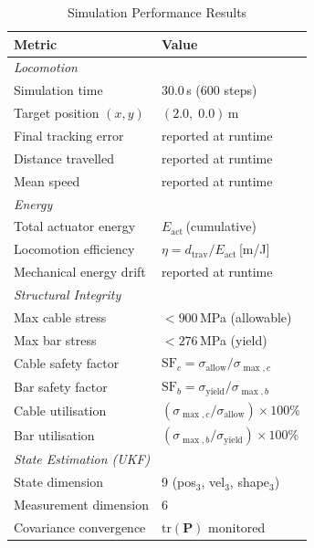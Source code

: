 \begin{table}[htbp]
\centering
\caption{Simulation Performance Results}
\label{tab:performance}
\begin{tabular}{l l}
\hline
\textbf{Metric} & \textbf{Value} \\
\hline
\multicolumn{2}{l}{\textit{Locomotion}} \\
Simulation time          & 30.0\,s (600 steps) \\
Target position $(x,y)$  & $(2.0,\;0.0)$\,m \\
Final tracking error     & reported at runtime \\
Distance travelled       & reported at runtime \\
Mean speed               & reported at runtime \\
\hline
\multicolumn{2}{l}{\textit{Energy}} \\
Total actuator energy    & $E_{\mathrm{act}}$\,(cumulative) \\
Locomotion efficiency    & $\eta = d_{\mathrm{trav}} / E_{\mathrm{act}}$\,[m/J] \\
Mechanical energy drift  & reported at runtime \\
\hline
\multicolumn{2}{l}{\textit{Structural Integrity}} \\
Max cable stress         & $<900$\,MPa (allowable) \\
Max bar stress           & $<276$\,MPa (yield) \\
Cable safety factor      & $\mathrm{SF}_c = \sigma_{\mathrm{allow}} / \sigma_{\max,c}$ \\
Bar safety factor        & $\mathrm{SF}_b = \sigma_{\mathrm{yield}} / \sigma_{\max,b}$ \\
Cable utilisation         & $(\sigma_{\max,c}/\sigma_{\mathrm{allow}}) \times 100\%$ \\
Bar utilisation           & $(\sigma_{\max,b}/\sigma_{\mathrm{yield}}) \times 100\%$ \\
\hline
\multicolumn{2}{l}{\textit{State Estimation (UKF)}} \\
State dimension          & 9 (pos$_3$, vel$_3$, shape$_3$) \\
Measurement dimension    & 6 \\
Covariance convergence   & $\mathrm{tr}(\mathbf{P})$ monitored \\
\hline
\end{tabular}
\end{table}




